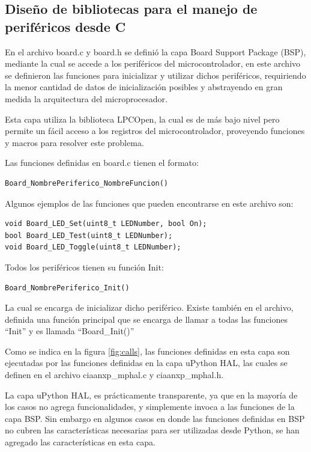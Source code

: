 
\subsection{Diseño de bibliotecas para el manejo de periféricos desde C}

En el archivo board.c y board.h se definió la capa Board Support Package (BSP), mediante la cual se accede a los periféricos del microcontrolador, en este archivo se definieron las funciones para inicializar y utilizar dichos periféricos, requiriendo la menor cantidad de datos de inicialización posibles y abstrayendo en gran medida la arquitectura del microprocesador.

Esta capa utiliza la biblioteca LPCOpen, la cual es de más bajo nivel pero permite un fácil acceso a los registros del microcontrolador, proveyendo funciones y macros para resolver este problema.

Las funciones definidas en board.c tienen el formato:

\begin{verbatim}
Board_NombrePeriferico_NombreFuncion()
\end{verbatim}

Algunos ejemplos de las funciones que pueden encontrarse en este archivo son:

\begin{verbatim}
void Board_LED_Set(uint8_t LEDNumber, bool On);
bool Board_LED_Test(uint8_t LEDNumber);
void Board_LED_Toggle(uint8_t LEDNumber);
\end{verbatim}

Todos los periféricos tienen su función Init:
\begin{verbatim}
Board_NombrePeriferico_Init()
\end{verbatim}

La cual se encarga de inicializar dicho periférico. Existe también en el archivo, definida una función principal que se encarga de llamar a todas las funciones “Init” y es llamada “Board\_Init()”

Como se indica en la figura \ref{fig:calls}, las funciones definidas en esta capa son ejecutadas por las funciones definidas en la capa uPython HAL, las cuales se definen en el archivo ciaanxp\_mphal.c y ciaanxp\_mphal.h.

La capa uPython HAL, es prácticamente transparente, ya que en la mayoría de los casos no agrega funcionalidades, y simplemente invoca a las funciones de la capa BSP. 
Sin embargo en algunos casos en donde las funciones definidas en BSP no cubren las características necesarias para ser utilizadas desde Python, se han agregado las características en esta capa.

